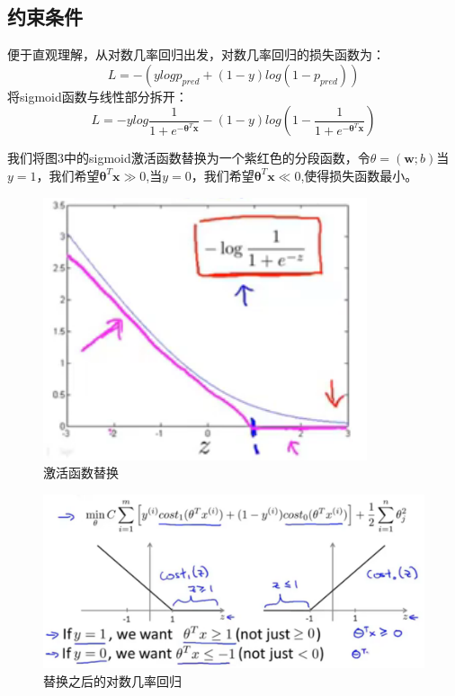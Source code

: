 \documentclass[UTF8]{ctexart} %
\begin{document}
\begin{multicols}{2}
			\subsection{约束条件}
				便于直观理解，从对数几率回归出发，对数几率回归的损失函数为：
				\[L=-(ylogp_{pred}+(1-y)log(1-p_{pred}))\]
				将sigmoid函数与线性部分拆开：
				\[L=-ylog\frac{1}{1+e^{-\bm{\theta}^T\bm{x}}}-(1-y)log(1-\frac{1}{1+e^{-\bm{\theta}^T\bm{x}}})\]
				
				我们将图3中的sigmoid激活函数替换为一个紫红色的分段函数，令$\theta=(\bm{w};b)$当$y=1$，我们希望$\bm{\theta}^T\bm{x}\gg0$,当$y=0$，我们希望$\bm{\theta}^T\bm{x}\ll0$,使得损失函数最小。
				\begin{figure}[H]
					\centering\includegraphics[scale=0.5]{3.png}
					\caption{激活函数替换}
				\end{figure}
				
				\begin{figure}[H]
					\centering\includegraphics[scale=0.23]{4.png}
					\caption{替换之后的对数几率回归}
				\end{figure}
				

\end{multicols}
\end{document}
